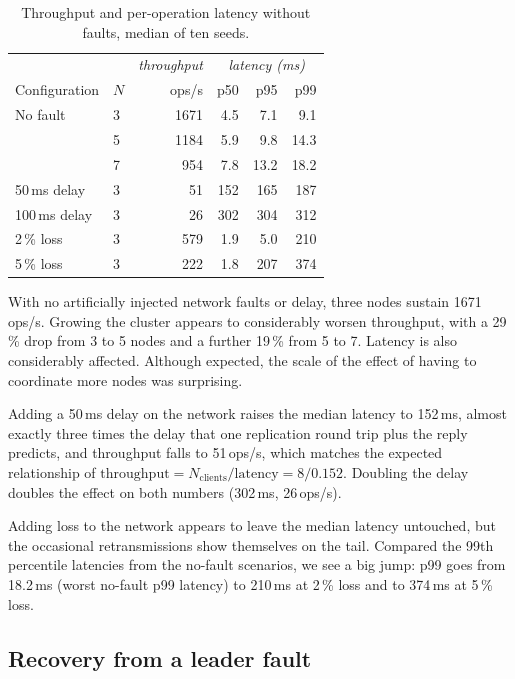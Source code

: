 \documentclass[conference]{IEEEtran}
\begin{document}
\begin{table}[h]
\centering
\small
\setlength{\tabcolsep}{4pt}
\caption{Throughput and per-operation latency without faults, median of ten seeds.}
\label{tab:perf}
\begin{tabular}{@{}llr@{\hspace{8pt}}|@{\hspace{8pt}}rrr@{}}
\toprule
 & & \emph{throughput} & \multicolumn{3}{c}{\emph{latency (ms)}} \\
Configuration & $N$ & ops/s & p50 & p95 & p99 \\
\midrule
No fault & 3 & 1671 & 4.5 & 7.1 & 9.1 \\
         & 5 & 1184 & 5.9 & 9.8 & 14.3 \\
         & 7 & 954 & 7.8 & 13.2 & 18.2 \\
50\,ms delay & 3 & 51 & 152 & 165 & 187 \\
100\,ms delay & 3 & 26 & 302 & 304 & 312 \\
2\,\% loss & 3 & 579 & 1.9 & 5.0 & 210 \\
5\,\% loss & 3 & 222 & 1.8 & 207 & 374 \\
\bottomrule
\end{tabular}
\end{table}


With no artificially injected network faults or delay, three nodes sustain 1671 ops/s. Growing the cluster appears to considerably worsen throughput, with a 29\,\% drop from 3 to 5 nodes and a further 19\,\% from 5 to 7. Latency is also considerably affected. Although expected, the scale of the effect of having to coordinate more nodes was surprising.

Adding a 50\,ms delay on the network raises the median latency to 152\,ms, almost exactly three times the delay that one replication round trip plus the reply predicts, and throughput falls to 51\,ops/s, which matches the expected relationship of $\text{throughput} = N_\text{clients} / \text{latency} =8/0.152$. Doubling the delay doubles the effect on both numbers (302\,ms, 26\,ops/s).

Adding loss to the network appears to leave the median latency untouched, but the occasional retransmissions show themselves on the tail. Compared the 99th percentile latencies from the no-fault scenarios, we see a big jump: p99 goes from 18.2\,ms (worst no-fault p99 latency) to 210\,ms at 2\,\% loss  and to 374\,ms at 5\,\% loss.

\subsection{Recovery from a leader fault}
\end{document}
